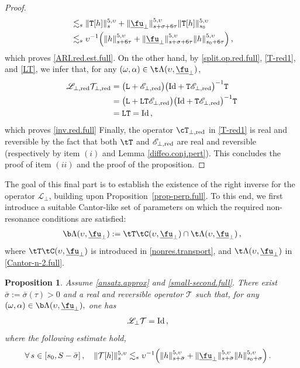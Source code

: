 \documentclass[a4paper,reqno,10pt]{article}
\newtheorem{pro}{Proposition}[section]
\newcommand{\sL}{\mathscr{L}}
\newcommand{\sE}{\mathscr{E}}
\begin{document}
\begin{proof}
\begin{align}
        &\lesssim_{s}   \| \mathtt{T}[h]\|_{s}^{5,\upsilon} + \| \underline{\fu}_{\perp}\|_{s+\sigma+6\tau}^{5,\upsilon} \|  \mathtt{T}[h] \|_{s_0}^{5,\upsilon}\\
      &\lesssim_{s} \upsilon^{-1}\Big(\|h\|_{s+6\tau}^{5,\upsilon}+ \| \underline{\fu}_{\perp}\|_{s+\sigma+6\tau}^{5,\upsilon} \|  h \|_{s_0+6\tau}^{5,\upsilon}\Big)\,,
	\end{align}
    which proves \eqref{ARI.red.est.full}.
    On the other hand, by \eqref{split.op.red.full}, \eqref{T-red1}, and \eqref{LT}, we infer that, for any $(\omega,\alpha)\in \t\Lambda(\upsilon,\underline{\fu}_{\perp})$,
    \begin{align}
        \sL_{\perp,{\rm red}}\mathcal{T}_{\perp,{\rm red}}&=\big(\mathtt{L}+  \sE_{\perp,{\rm red}}  \big)\big({\rm Id}+\mathtt{T}\sE_{\perp,{\rm red}}  \big)^{-1}\mathtt{T}\\
        &=\big(\mathtt{L}+\mathtt{L}\mathtt{T}\sE_{\perp,{\rm red}}  \big)\big({\rm Id}+\mathtt{T} \sE_{\perp,{\rm red}}  \big)^{-1}\mathtt{T} \\
        &=\mathtt{L}\mathtt{T} = {\rm Id} \,,
    \end{align}
which proves \eqref{inv.red.full}
       Finally, the operator $\cT_{\perp,{\rm red}}$ in \eqref{T-red1} is real and reversible by the fact that both $\tT$ and $\sE_{\perp,{\rm red}}$ are real and reversible (respectively by item $(i)$ and Lemma \ref{diffeo.conj.pert}). This concludes the proof of item $(ii)$ and the proof of the proposition.
\end{proof}
The goal of this final part is to establish the existence of the right inverse  for the operator $\sL_{\perp}$, building upon Proposition~\ref{prop-perp.full}. 
To this end, we first introduce a suitable Cantor-like set of parameters on which the required non-resonance conditions are satisfied:
\begin{align}\label{nonres.set.inv.full}
          \b\Lambda(\upsilon,\underline{\fu}_{\perp}) 
         := \tT\tC(\upsilon,\underline{\fu}_{\perp}) \cap \t\Lambda(\upsilon,\underline{\fu}_{\perp})\,,
    \end{align}
    where $\tT\tC(\upsilon,\underline{\fu}_{\perp})$ is introduced in \eqref{nonres.transport}, and $\t\Lambda (\upsilon,\underline{\fu}_{\perp})$ in \eqref{Cantor-n-2.full}. 
\begin{pro}\label{prop.full.inv}
    Assume \eqref{ansatz.approx} and \eqref{small-second.full}. 
There exist $\bar\sigma:=\bar\sigma(\tau)>0$ and a real and reversible operator $\mathcal{T}$ such that, for any
$(\omega,\alpha)\in\b\Lambda(\upsilon,\underline{\fu}_{\perp}),$ one has 
\begin{align}\label{full.inv.id}
		\sL_{\perp} \mathcal{T} & ={\rm Id}\,,
        \end{align} 
       where the following estimate hold,
        \begin{align}	
      \forall\, s\in [s_0,S-\bar\sigma] \,, \quad   \| \mathcal{T}[h]  \|_{s}^{5,\upsilon} 
      &\lesssim_{s}  \upsilon^{-1}\Big(\|h\|_{s+\bar\sigma}^{5,\upsilon}+ \| \underline{\fu}_{\perp}\|_{s+\bar\sigma}^{5,\upsilon} \|  h \|_{s_0+\sigma}^{5,\upsilon}\Big)\,.\label{cT.est.full}
	\end{align}
\end{pro}
\end{document}
